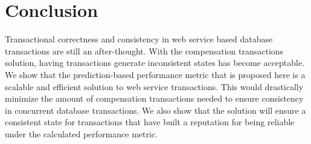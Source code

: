 \documentclass[conference]{IEEEtran}
\begin{document}
\section*{Conclusion}
Transactional correctness and consistency in web service based database transactions are still an after-thought. With the compensation transactions solution, having transactions generate inconsistent states has become acceptable. We show that the prediction-based performance metric that is proposed here is a scalable and efficient solution to web service transactions. This would drastically minimize the amount of compensation transactions needed to ensure consistency in concurrent database transactions. We also show that the solution will ensure a consistent state for transactions that have built a reputation for being reliable under the calculated performance metric.



\ifCLASSOPTIONcaptionsoff
  \newpage
\fi





%
%
%


\end{document}
